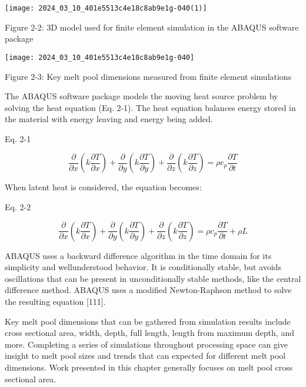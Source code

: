 \documentclass[10pt]{article}
\begin{document}
\begin{center}
\texttt{[image: 2024\_03\_10\_401e5513c4e18c8ab9e1g-040(1)]}
\end{center}

Figure 2-2: 3D model used for finite element simulation in the ABAQUS software package

\begin{center}
\texttt{[image: 2024\_03\_10\_401e5513c4e18c8ab9e1g-040]}
\end{center}

Figure 2-3: Key melt pool dimensions measured from finite element simulations

The ABAQUS software package models the moving heat source problem by solving the heat equation (Eq. 2-1). The heat equation balances energy stored in the material with energy leaving and energy being added.

Eq. 2-1

$$
\frac{\partial}{\partial x}\left(k \frac{\partial T}{\partial x}\right)+\frac{\partial}{\partial y}\left(k \frac{\partial T}{\partial y}\right)+\frac{\partial}{\partial z}\left(k \frac{\partial T}{\partial z}\right)=\rho c_{p} \frac{\partial T}{\partial t}
$$

When latent heat is considered, the equation becomes:

Eq. 2-2

$$
\frac{\partial}{\partial x}\left(k \frac{\partial T}{\partial x}\right)+\frac{\partial}{\partial y}\left(k \frac{\partial T}{\partial y}\right)+\frac{\partial}{\partial z}\left(k \frac{\partial T}{\partial z}\right)=\rho c_{p} \frac{\partial T}{\partial t}+\rho L
$$

ABAQUS uses a backward difference algorithm in the time domain for its simplicity and wellunderstood behavior. It is conditionally stable, but avoids oscillations that can be present in unconditionally stable methods, like the central difference method. ABAQUS uses a modified Newton-Raphson method to solve the resulting equation [111].

Key melt pool dimensions that can be gathered from simulation results include cross sectional area, width, depth, full length, length from maximum depth, and more. Completing a series of simulations throughout processing space can give insight to melt pool sizes and trends that can expected for different melt pool dimensions. Work presented in this chapter generally focuses on melt pool cross sectional area.
\end{document}
